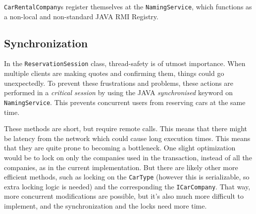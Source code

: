 \documentclass[a4paper]{article}
\begin{document}
\texttt{CarRentalCompany}s register themselves at the \texttt{NamingService}, which functions as a non-local and non-standard JAVA RMI Registry.

\subsection{Synchronization}
In the \texttt{ReservationSession} class, thread-safety is of utmost importance. When multiple clients are making quotes and confirming them, things could go unexpectedly. To prevent these frustrations and problems, these actions are performed in a \emph{critical session} by using the JAVA \emph{synchronised} keyword on \texttt{NamingService}. This prevents concurrent users from reserving cars at the same time.

These methods are short, but require remote calls. This means that there might be latency from the network which could cause long execution times. This means that they are quite prone to becoming a bottleneck. One slight optimization would be to lock on only the companies used in the transaction, instead of all the companies, as in the current implementation. But there are likely other more efficient methods, such as locking on the \texttt{CarType} (however this is serializable, so extra locking logic is needed) and the corresponding the \texttt{ICarCompany}. That way, more concurrent modifications are possible, but it's also much more difficult to implement, and the synchronization and the locks need more time.
\end{document}
